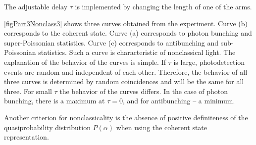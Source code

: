 

The adjustable delay $\tau$ is implemented by changing the length of one of the
arms.



\autoref{figPart3Nonclass3} shows three curves obtained from the experiment. Curve (b) corresponds
to the coherent state. Curve (a) corresponds to photon bunching and
super-Poissonian statistics. Curve (c) corresponds
to antibunching and sub-Poissonian statistics. Such a curve is characteristic
of nonclassical light. The explanation of the behavior of the curves is simple. If
$\tau$ is large, photodetection events are random and independent of each other.
Therefore, the behavior of all three curves is determined by random
coincidences and will be the same for all three. For small $\tau$
the behavior of the curves differs. In the case of photon bunching, there is a
maximum at $\tau = 0$, and for antibunching – a minimum.

Another criterion for nonclassicality is the absence of positive
definiteness of the quasiprobability distribution $P\left(\alpha\right)$ when
using the coherent state representation.

